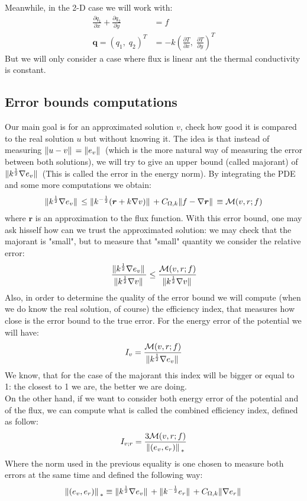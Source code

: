 \documentclass{article}
\begin{document}
	Meanwhile, in the 2-D case we will work with:
	\begin{align*}
	\frac{\partial q_1}{\partial x} + \frac{\partial q_2}{\partial y}  &= f \\
	\bm{q} = (q_1,\; q_2)^T  &= -k \left( \frac{\partial T}{\partial x} ,\; \frac{\partial T}{\partial y}\right)^T
	\end{align*}
	But we will only consider a case where flux is linear ant the thermal conductivity is constant.
	
	\subsection*{Error bounds computations}
	Our main goal is for an approximated solution $v$, check how good it is compared to the real solution $u$ but without knowing it. The idea is that instead of measuring $\norm*{u-v} = \norm*{e_v}$ (which is the more natural way of measuring the error between both solutions), we will try to give an upper bound (called majorant) of $\norm*{k^{\frac{1}{2}}\nabla e_v}$ (This is called the error in the energy norm). By integrating the PDE and some more computations we obtain:
	\begin{align*}
	\norm*{k^{\frac{1}{2}}\nabla e_v} \leq \norm*{k^{-\frac{1}{2}}(\bm{r}+k\nabla v)} + C_{\Omega,k}\norm*{f-\nabla \bm{r}} \equiv \mathcal{M}(v,r;f)
	\end{align*}
	where $\bm{r}$ is an approximation to the flux function.
	With this error bound, one may ask hisself how can we trust the approximated solution: we may check that the majorant is "small", but to measure that "small" quantity we consider the relative error:
	\begin{align*}
	\frac{\norm*{k^{\frac{1}{2}}\nabla e_v}}{\norm*{k^{\frac{1}{2}}\nabla v}} \leq \frac{\mathcal{M}(v,r;f)}{\norm*{k^{\frac{1}{2}}\nabla v}}
	\end{align*}
	Also, in order to determine the quality of the error bound we will compute (when we do know the real solution, of course) the efficiency index, that measures how close is the error bound to the true error. For the energy error of the potential we will have:
	\begin{align*}
	I_v = \frac{\mathcal{M}(v,r;f)}{\norm*{k^{\frac{1}{2}}\nabla e_v}}
	\end{align*}
	We know, that for the case of the majorant this index will be bigger or equal to 1: the closest to 1 we are, the better we are doing.\\
	On the other hand, if we want to consider both energy error of the potential and of the flux, we can compute what is called the combined efficiency index, defined as follow:
	\begin{align*}
	I_{v;r} = \frac{3\mathcal{M}(v,r;f)}{\norm*{(e_v, e_r)}_*}
	\end{align*}
	Where the norm used in the previous equality is one chosen to measure both errors at the same time and defined the following way:
	\begin{align*}
	\norm*{(e_v,e_r)}_{*} \equiv \norm*{k^{\frac{1}{2}}\nabla e_v} + \norm*{k^{-\frac{1}{2}}e_r} + C_{\Omega,k}\norm*{\nabla e_r}
	\end{align*}
	
\end{document}
